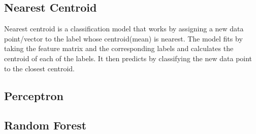 \subsection{Nearest Centroid}
Nearest centroid is a classification model that works by assigning a new data point/vector to the label whose centroid(mean) is nearest. The model fits by taking the feature matrix and the corresponding labels and calculates the centroid of each of the labels. It then predicts by classifying the new data point to the closest centroid.
\subsection{Perceptron}
\subsection{Random Forest}
